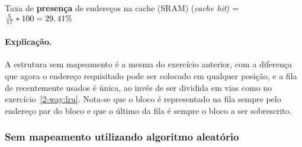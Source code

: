 Taxa de {\bf presença} de endereços na cache (SRAM) ({\em cache hit}) = ${5
  \over 17} * 100 = 29,41\%$

\paragraph{Explicação.} A estrutura sem mapeamento é a mesma do
exercício anterior, com a diferença que agora o endereço requisitado
pode ser colocado em qualquer posição, e a fila de recentemente usados
é única, ao invés de ser dividida em vias como no
exercício~\ref{2-way:lru}. Nota-se que o bloco é representado na fila
sempre pelo endereço par do bloco e que o último da fila é sempre o
bloco a ser sobrescrito.

\newpage
\subsubsection*{Sem mapeamento utilizando algoritmo aleatório}
\label{2-way:lru}

\setcounter{themiss}{0}
\setcounter{thehit}{0}
\def\tdist{8cm}

